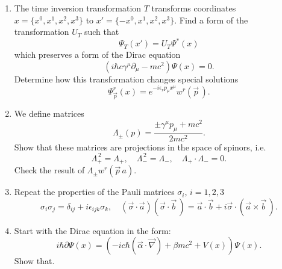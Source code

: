 \documentclass[a4paper,11pt]{article}
\begin{document}
\begin{enumerate}
\item The time inversion transformation $T$ transforms coordinates
  $x = \{ x^{ 0 }, x^{ 1 }, x^{ 2 }, x^{ 3 } \}$ to
  $x' = \{ -x^{ 0 }, x^{ 1 }, x^{ 2 }, x^{ 3 } \}$. Find a form of the
  transformation $U_{ T }$ such that
  \begin{equation}
    \label{eq:20}
    \Psi_{ T }( x' ) = U_{ T } \Psi^{ * }( x )
  \end{equation}
  which preserves a form of the Dirac equation
  \begin{equation}
    \label{eq:21}
    \left( i\hbar c \gamma^{ \mu } \partial_{ \mu } - m c^{ 2 } \right) \Psi( x ) = 0.
  \end{equation}
  Determine how this transformation changes special solutions
  \begin{equation}
    \label{eq:22}
    \Psi_{ \vec{ p } }^{ r }( x )
    = e^{ -i\epsilon_{ r } p_{ \mu } x^{ \mu } } w^{ r }( \vec{ p } \, ).
  \end{equation}

\item We define matrices
  \begin{equation}
    \label{eq:23}
    \Lambda_{ \pm }( p )
    = \frac{ \pm\gamma^{ \mu } p_{ \mu } + m c^{ 2 } }{ 2 m c^{ 2 } }.
  \end{equation}
  Show that these matrices are projections in the space of spinors,
  i.e.
  \begin{equation}
    \label{eq:24}
    \Lambda_{ + }^{ \, 2 } = \Lambda_{ + }, \quad
    \Lambda_{ - }^{ \, 2 } = \Lambda_{ - }, \quad
    \Lambda_{ + } \cdot \Lambda_{ - } = 0.
  \end{equation}
  Check the result of $\Lambda_{ \pm } w^{ r }( \vec{ p } \,a )$.

\item Repeat the properties of the Pauli matrices $\sigma_{ i }$,
  $i = 1, 2, 3$
  \begin{equation}
    \label{eq:16}
    \sigma_{ i } \sigma_{ j } = \delta_{ i j } + i \epsilon_{ i j k } \sigma_{ k }, \quad
    \left( \vec{ \sigma } \cdot \vec{ a } \right)
    \left( \vec{ \sigma } \cdot \vec{ b } \, \right)
    =
    \vec{ a } \cdot \vec{ b }
    + i \vec{ \sigma } \cdot \left( \vec{ a } \times \vec{ b } \, \right).
  \end{equation}

\item Start with the Dirac equation in the form:
  \begin{equation}
    \label{eq:25}
    i \hbar \partial \Psi( x )
    =
    \left( -ic\hbar \left( \vec{ \alpha } \cdot \vec{ \nabla } \right)
      + \beta m c^{ 2 } + V( x ) \right) \Psi( x ).
  \end{equation}
  Show that.


\end{enumerate}
\end{document}
